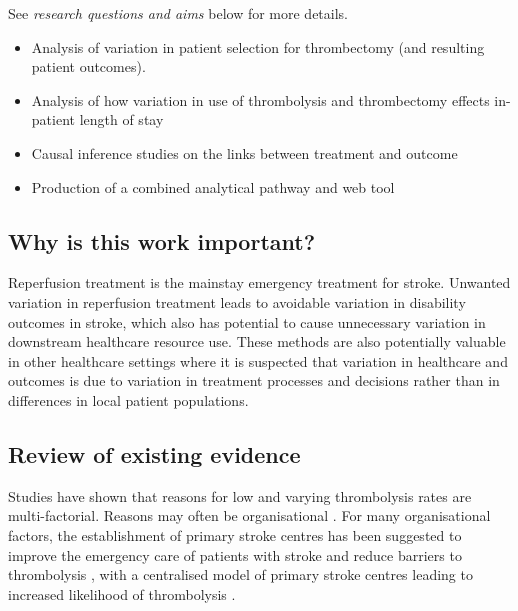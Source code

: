 See \textit{research questions and aims} below for more details. 

\begin{itemize}
    \item Analysis of variation in patient selection for thrombectomy (and resulting patient outcomes).

    \item Analysis of how variation in use of thrombolysis and thrombectomy effects in-patient length of stay

    \item Causal inference studies on the links between treatment and outcome

    \item Production of a combined analytical pathway and web tool
    
\end{itemize}

\subsection{Why is this work important?}

Reperfusion treatment is the mainstay emergency treatment for stroke. Unwanted variation in reperfusion treatment leads to avoidable variation in disability outcomes in stroke, which also has potential to cause unnecessary variation in downstream healthcare resource use. These methods are also potentially valuable in other healthcare settings where it is suspected that variation in healthcare and outcomes is due to variation in treatment processes and decisions rather than in differences in local patient populations.

\subsection{Review of existing evidence}

Studies have shown that reasons for low and varying thrombolysis rates are multi-factorial. Reasons may often be organisational \cite{aguiar_de_sousa_access_2019, kamal_delays_2017, carter-jones_stroke_2011}. For many organisational factors, the establishment of primary stroke centres has been suggested to improve the emergency care of patients with stroke and reduce barriers to thrombolysis \cite{carter-jones_stroke_2011},  with a centralised model of primary stroke centres leading to increased likelihood of thrombolysis \cite{lahr_proportion_2012, morris_impact_2014, hunter_impact_2013}. 

